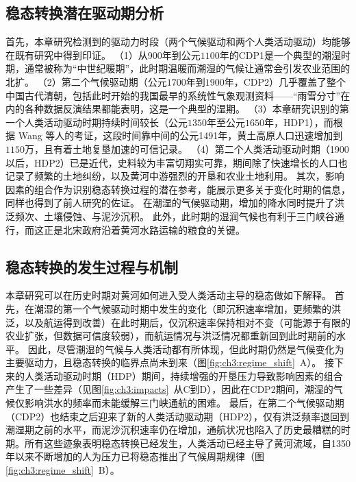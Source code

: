 \subsection{稳态转换潜在驱动期分析}

首先，本章研究检测到的驱动力时段（两个气候驱动和两个人类活动驱动）均能够在既有研究中得到印证。
（1）从900年到公元$1100$年的CDP1是一个典型的潮湿时期，通常被称为“中世纪暖期”\cite{zhang1993, zhang1994, man2014}，此时期温暖而潮湿的气候让通常会引发农业范围的北扩\cite{TanQiXiang1996,GeQuanSheng2011}。
（2）第二个气候驱动期（公元$1700$年到$1900$年，CDP2）几乎覆盖了整个中国古代清朝，包括此时开始的我国最早的系统性气象观测资料——“雨雪分寸”在内的各种数据反演结果都能表明，这是一个典型的湿期\cite{hao2021, ge2008}。
（3）本章研究识别的第一个人类活动驱动时期持续时间较长（公元$1350$年至公元$1650$年，HDP1），而根据 Wang 等人的考证，这段时间靠中间的公元1491年，黄土高原人口迅速增加到$1150$万，且有着土地复垦加速的可信记录\cite{wang2006b}。
（4）第二个人类活动驱动时期（1900以后，HDP2）已是近代，史料较为丰富切翔实可靠，期间除了快速增长的人口也记录了频繁的土地纠纷，以及黄河中游强烈的开垦和农业土地利用\cite{GeJianXiong2005}。
其次，影响因素的组合作为识别稳态转换过程的潜在参考，能展示更多关于变化时期的信息，同样也得到了前人研究的佐证。
在潮湿的气候驱动期，增加的降水同时提升了洪泛频次、土壤侵蚀、与泥沙沉积\cite{chen2012}。
此外，此时期的湿润气候也有利于三门峡谷通行，而这正是北宋政府沿着黄河水路运输的粮食的关键\cite{WangShouChun1993}。

\subsection{稳态转换的发生过程与机制}

本章研究可以在历史时期对黄河如何进入受人类活动主导的稳态做如下解释。
首先，在潮湿的第一个气候驱动时期中发生的变化（即沉积速率增加，更频繁的洪泛，以及航运得到改善）在此时期后，仅沉积速率保持相对不变（可能源于有限的农业扩张，但数据可信度较弱），而航运情况与洪泛情况都重新回到此时期前的水平。
因此，尽管潮湿的气候与人类活动都有所体现，但此时期仍然是气候变化为主要驱动力，且稳态转换的临界点尚未到来（图\ref{fig:ch3:regime_shift}~A）。
接下来的人类活动驱动时期（HDP）期间，持续增强的开垦压力导致影响因素的组合产生了一些差异（见图\ref{fig:ch3:impacts}~从C到D），因此在CDP2期间，潮湿的气候仅影响洪水的频率而未能缓解三门峡通航的困难。
最后，在第二个气候驱动期（CDP2）也结束之后迎来了新的人类活动驱动期（HDP2），仅有洪泛频率退回到潮湿期之前的水平，而泥沙沉积速率仍在增加，通航状况也陷入了历史最糟糕的时期。所有这些迹象表明稳态转换已经发生，人类活动已经主导了黄河流域，自1350年以来不断增加的人为压力已将稳态推出了气候周期规律（图\ref{fig:ch3:regime_shift}~B）。

